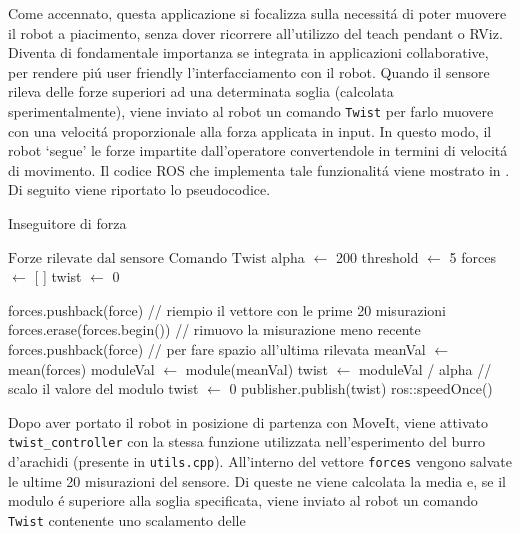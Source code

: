 Come accennato, questa applicazione si focalizza sulla necessit\'{a} di poter muovere il robot a piacimento, senza dover 
ricorrere all'utilizzo del teach pendant o RViz. 
Diventa di fondamentale importanza se integrata in applicazioni collaborative, per rendere pi\'{u} user friendly l'interfacciamento 
con il robot. 
Quando il sensore rileva delle forze superiori ad una determinata soglia (calcolata sperimentalmente), viene inviato al robot un 
comando \verb|Twist| per farlo muovere con una velocit\'{a} proporzionale alla forza applicata in input. In questo modo, il robot `segue' 
le forze impartite dall'operatore convertendole in termini di velocit\'{a} di movimento. 
Il codice ROS che implementa tale funzionalit\'{a} viene mostrato in \cite{force_follower}. 
Di seguito viene riportato lo pseudocodice. 
\begin{algorithm}[H]
\caption{Inseguitore di forza}\label{algo:force_follower}
\begin{algorithmic}[1]
    \Require $\text{Forze rilevate dal sensore}$
    \Ensure $\text{Comando Twist}$
    \State alpha $\gets$ 200
    \State threshold $\gets$ 5
    \State forces $\gets$ [ ]
    \State twist $\gets$ 0
    
        \State forces.pushback(force) // riempio il vettore con le prime 20 misurazioni
    \Else
        \State forces.erase(forces.begin()) // rimuovo la misurazione meno recente
        \State forces.pushback(force) // per fare spazio all'ultima rilevata
        \State meanVal $\gets$ mean(forces)
        \State moduleVal $\gets$ module(meanVal) 
            \State twist $\gets$ moduleVal / alpha // scalo il valore del modulo
        \Else
            \State twist $\gets$ 0
        \EndIf
        \State publisher.publish(twist)
    \EndIf
    \State ros::speedOnce()
    \EndWhile
\end{algorithmic}
\end{algorithm}
Dopo aver portato il robot in posizione di partenza con MoveIt, viene attivato \verb|twist_controller| con la stessa funzione 
utilizzata nell'esperimento del burro d'arachidi (presente in \verb|utils.cpp|).  
All'interno del vettore \verb|forces| vengono salvate le ultime 20 misurazioni del sensore. Di queste ne viene calcolata la media 
e, se il modulo \'{e} superiore alla soglia specificata, viene inviato al robot un comando \verb|Twist| contenente uno scalamento delle 
